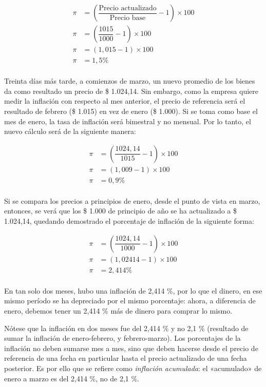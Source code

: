 \documentclass[12pt,a4paper,twoside]{book}
\begin{document}
\begin{align*}
\pi &= \left( \dfrac{\text{Precio actualizado}}{\text{Precio base}} - 1 \right) \times 100 \\
\pi &= \left( \dfrac{1015}{1000} -1 \right) \times 100 \\
\pi &= \left( 1,015 - 1 \right) \times 100 \\
\pi &= 1,5 \% \\
\end{align*}

Treinta días más tarde, a comienzos de marzo, un nuevo promedio de los bienes da como resultado un precio de \$ 1.024,14. Sin embargo, como la empresa quiere medir la inflación con respecto al mes anterior, el precio de referencia será el resultado de febrero (\$ 1.015) en vez de enero (\$ 1.000). Si se toma como base el mes de enero, la tasa de inflación será bimestral y no mensual. Por lo tanto, el nuevo cálculo será de la siguiente manera:

\begin{align*}
\pi &= \left( \dfrac{1024,14}{1015} -1 \right) \times 100 \\
\pi &= \left( 1,009 - 1 \right) \times 100 \\
\pi &= 0,9 \% \\
\end{align*}

Si se compara los precios a principios de enero, desde el punto de vista en marzo, entonces, se verá que los \$ 1.000 de principio de año se ha actualizado a \$ 1.024,14, quedando demostrado el porcentaje de inflación de la siguiente forma:

\begin{align*}
\pi &= \left( \dfrac{1024,14}{1000} -1 \right) \times 100 \\
\pi &= \left( 1,02414 - 1 \right) \times 100 \\
\pi &= 2,414 \% \\
\end{align*}

En tan solo dos meses, hubo una inflación de 2,414 \%, por lo que el dinero, en ese mismo período se ha depreciado por el mismo porcentaje: ahora, a diferencia de enero, debemos tener un 2,414 \% más de dinero para comprar lo mismo.

Nótese que la inflación en dos meses fue del 2,414 \% y no 2,1 \% (resultado de sumar la inflación de enero-febrero, y febrero-marzo). Los porcentajes de la inflación no deben sumarse mes a mes, sino que deben hacerse desde el precio de referencia de una fecha en particular hasta el precio actualizado de una fecha posterior. Es por ello que se refiere como \textit{inflación acumulada}: el «acumulado» de enero a marzo es del 2,414 \%, no de 2,1 \%.
\end{document}
